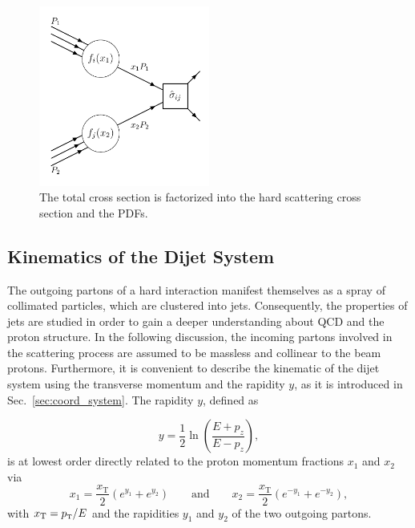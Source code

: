 \begin{figure}[htbp]
    \centering
    \includegraphics[width=0.5\textwidth]{figures/drawings/hardscattering.pdf}
    \caption[Factorization of hard scattering cross section.]
        {The total cross section is factorized into the hard scattering cross
        section and the PDFs.}
    \label{fig:crosssection_factorization}
\end{figure}

\subsection{Kinematics of the Dijet System}
\label{sec:dijet_kinematics}

The outgoing partons of a hard interaction manifest themselves as a spray of
collimated particles, which are clustered into jets. Consequently, the
properties of jets are studied in order to gain a deeper understanding about
QCD and the proton structure. In the following discussion, the incoming partons
involved in the scattering process are assumed to be massless and collinear to
the beam protons. Furthermore, it is convenient to describe the kinematic of
the dijet system using the transverse momentum \pt and the rapidity $y$, as it
is introduced in Sec.~\ref{sec:coord_system}. The rapidity $y$, defined as

\begin{equation*}
    y = \frac{1}{2} \ln \left( \frac{E+p_z}{E-p_z} \right),
\end{equation*}
%
is at lowest order directly related to the proton momentum fractions $x_1$ and
$x_2$ via
%
\begin{equation*}
    x_1 = \frac{x_\mathrm{T}}{2} \left( e^{y_1} + e^{y_2} \right)
    \qquad\text{and}\qquad x_2 = \frac{x_\mathrm{T}}{2} \left( e^{-y_1} +
    e^{-y_2} \right),
\end{equation*}
%
with $x_{\mathrm{T}} = \pt/E$ and the rapidities $y_1$ and $y_2$ of the
two outgoing partons.



